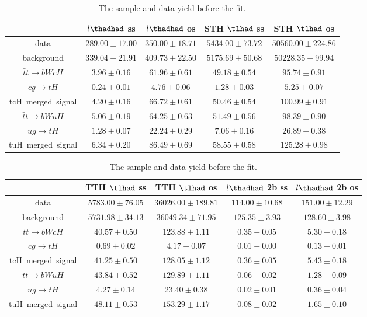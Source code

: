 \begin{table}
\footnotesize
\caption{The sample and data yield before the fit.}
\centering
\begin{tabular}{|c|c|c|c|c|} \hline
 & $l\thadhad$ ss & $l\thadhad$ os & STH $\tlhad$ ss & STH $\tlhad$ os\\\hline
data & $289.00\pm17.00$ & $350.00\pm18.71$ & $5434.00\pm73.72$ & $50560.00\pm224.86$\\\hline
background & $339.04\pm21.91$ & $409.73\pm22.50$ & $5175.69\pm50.68$ & $50228.35\pm99.94$\\\hline
$\bar{t}t\to bWcH$ & $3.96\pm0.16$ & $61.96\pm0.61$ & $49.18\pm0.54$ & $95.74\pm0.91$\\\hline
$cg\to tH$ & $0.24\pm0.01$ & $4.76\pm0.06$ & $1.28\pm0.03$ & $5.25\pm0.07$\\\hline
tcH~merged~signal & $4.20\pm0.16$ & $66.72\pm0.61$ & $50.46\pm0.54$ & $100.99\pm0.91$\\\hline
$\bar{t}t\to bWuH$ & $5.06\pm0.19$ & $64.25\pm0.63$ & $51.49\pm0.56$ & $98.39\pm0.90$\\\hline
$ug\to tH$ & $1.28\pm0.07$ & $22.24\pm0.29$ & $7.06\pm0.16$ & $26.89\pm0.38$\\\hline
tuH~merged~signal & $6.34\pm0.20$ & $86.49\pm0.69$ & $58.55\pm0.58$ & $125.28\pm0.98$\\\hline
\end{tabular}
\begin{tabular}{|c|c|c|c|c|} \hline
 & TTH $\tlhad$ ss & TTH $\tlhad$ os & $l\thadhad$ 2b ss & $l\thadhad$ 2b os\\\hline
data & $5783.00\pm76.05$ & $36026.00\pm189.81$ & $114.00\pm10.68$ & $151.00\pm12.29$\\\hline
background & $5731.98\pm34.13$ & $36049.34\pm71.95$ & $125.35\pm3.93$ & $128.60\pm3.98$\\\hline
$\bar{t}t\to bWcH$ & $40.57\pm0.50$ & $123.88\pm1.11$ & $0.35\pm0.05$ & $5.30\pm0.18$\\\hline
$cg\to tH$ & $0.69\pm0.02$ & $4.17\pm0.07$ & $0.01\pm0.00$ & $0.13\pm0.01$\\\hline
tcH~merged~signal & $41.25\pm0.50$ & $128.05\pm1.12$ & $0.36\pm0.05$ & $5.43\pm0.18$\\\hline
$\bar{t}t\to bWuH$ & $43.84\pm0.52$ & $129.89\pm1.11$ & $0.06\pm0.02$ & $1.28\pm0.09$\\\hline
$ug\to tH$ & $4.27\pm0.14$ & $23.40\pm0.38$ & $0.02\pm0.01$ & $0.36\pm0.04$\\\hline
tuH~merged~signal & $48.11\pm0.53$ & $153.29\pm1.17$ & $0.08\pm0.02$ & $1.65\pm0.10$\\\hline

\end{tabular}
\end{table}

